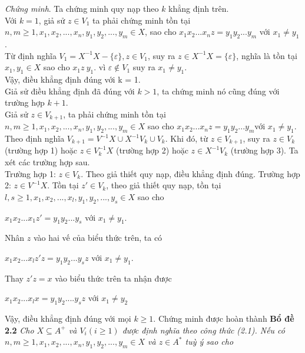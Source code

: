 \begin{flushleft}
\textit{Chứng minh}. Ta chứng minh quy nạp theo $k$ khẳng định trên.\\
\hspace{10mm} Với $k = 1$, giả sử $z \in V_1$ ta phải chứng minh tồn tại $n,m \ge 1, x_1, x_2, ..., x_n, y_1, y_2, ...,y_m \in X$, sao cho $x_1x_2...x_nz = y_1y_2...y_m$ với $x_1 \ne y_1$.\\
\hspace{10mm}Từ định nghĩa $V_1 = X^{-1}X - \{ \varepsilon \}, z\in V_1$, suy ra $z \in X^{-1}X = \{ \varepsilon \}$, nghĩa là tồn tại $x_1, y_1 \in X$ sao cho $x_1z \ y_1$. vì $\varepsilon \not\in V_1$ suy ra $x_1 \ne y_1$. \\
\hspace{10mm}Vậy, điều khẳng định đúng với k = 1.\\
\hspace{10mm}Giả sử điều khẳng định đã đúng với $k > 1$, ta chứng minh nó cũng đúng với trường hợp $k + 1$.\\
\hspace{10mm}Giả sử $z \in V_{k+1}$, ta phải chứng minh tồn tại $n,m \ge 1, x_1, x_2, ... , x_n, y_1, y_2,...,y_m \in X$ sao cho $x_1x_2...x_n z = y_1y_2...y_m$với $x_1 \ne y_1$.\\
\hspace{10mm}Theo định nghĩa $V_{k+1} = V^{-1}X \cup X^{-1}V_k \cup V_k$. Khi đó, từ $z \in V_{k+1}$, suy ra $z \in V_k$ (trường hợp 1) hoặc $z \in V_k^{-1}X$ (trường hợp 2) hoặc $z \in X^{-1}V_k$ (trường hợp 3). Ta xét các trường hợp sau.\\
\hspace{10mm}Trường hợp 1: $z \in V_k$. Theo giả thiết quy nạp, điều khẳng định đúng.
\hspace{10mm}Trường hợp 2: $z \in V^{-1}X$. Tồn tại $z' \in V_k$, theo giả thiết quy nạp, tồn tại $l,s \ge 1,x_1,x_2,...,x_l, y_1, y_2,...,y_s \in X$ sao cho
\end{flushleft}
$x_1x_2...x_1 z' = y_1y_2...y_s$ với $x_1 \ne y_1$.
\begin{flushleft}
Nhân $z$ vào hai vế của biểu thức trên, ta có
\end{flushleft}
$x_1x_2...x_l z' z = y_1y_2...y_s z$ với $x_1 \ne y_1$.
\begin{flushleft}
Thay $z'z = x$ vào biểu thức trên ta nhận được
\end{flushleft}
$x_1x_2...x_lx = y_1y_2....y_sz$ với $x_1 \ne y_2$ 
\begin{flushleft}
\hspace{10mm}Vậy, điều khẳng định đúng với mọi $k \ge 1$.
\hspace{10mm}Chứng minh được hoàn thành
\textbf{Bổ đề 2.2}     \textit{Cho $X \subseteq A^+ $ và $V_i (i \ge 1)$ được định nghĩa theo công thức (2.1). Nếu có $n,m \ge 1, x_1, x_2,...,x_n, y_1, y_2, ... , y_m \in X$ và $z \in A^*$ tuỳ ý sao cho}
\end{flushleft}
